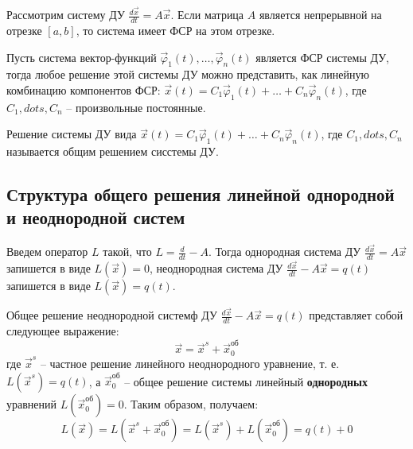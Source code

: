     \begin{theorem}
        Рассмотрим систему ДУ $\frac{d \vec x}{dt} = A \vec x$. Если матрица $A$ является непрерывной на отрезке $[a, b]$, то система
        имеет ФСР на этом отрезке.
    \end{theorem}

    \begin{theorem}
        Пусть система вектор-функций $\vec \varphi_1(t), \dots, \vec \varphi_n(t)$ является ФСР системы ДУ, тогда
        любое решение этой системы ДУ можно представить, как линейную комбинацию компонентов ФСР: 
        $\vec x(t) = C_1 \vec \varphi_1(t) + \dots + C_n \vec \varphi_n(t)$, где $C_1, dots, C_n$ -- произвольные постоянные.
    \end{theorem}

    \begin{definition}
        Решение системы ДУ вида $\vec x(t) = C_1 \vec \varphi_1(t) + \dots + C_n \vec \varphi_n(t)$, где $C_1, dots, C_n$
        называется общим решением сисстемы ДУ.
    \end{definition}

    \subsection*{Структура общего решения линейной однородной и неоднородной систем}

    Введем оператор $L$ такой, что $L = \frac{d}{dt} - A$. Тогда однородная система ДУ $\frac{d \vec x}{dt} = A \vec x$ запишется в виде
    $L(\vec x) = 0$, неоднородная система ДУ $\frac{d \vec x}{dt} - A \vec x = q(t)$ запишется в виде $L(\vec x) = q(t)$.

    \begin{proposition}
        Общее решение неоднородной системф ДУ $\frac{d \vec x}{dt} - A \vec x = q(t)$ представляет собой следующее выражение:
        \begin{equation*}
            \vec x = \vec x^s + \vec x^{\text{об}}_0
        \end{equation*}
        где $\vec x^s$ -- частное решение линейного неоднородного уравнение, т. е. $L(\vec x^s) = q(t)$, а
        $\vec x^{\text{об}}_0$ -- общее решение системы линейный \textbf{однородных} уравнений $L(\vec x^{\text{об}}_0) = 0$.
        Таким образом, получаем:
        \[L(\vec x) = L(\vec x^s + \vec x^{\text{об}}_0) = L(\vec x^s) + L(\vec x^{\text{об}}_0) = q(t) + 0\]
    \end{proposition}

